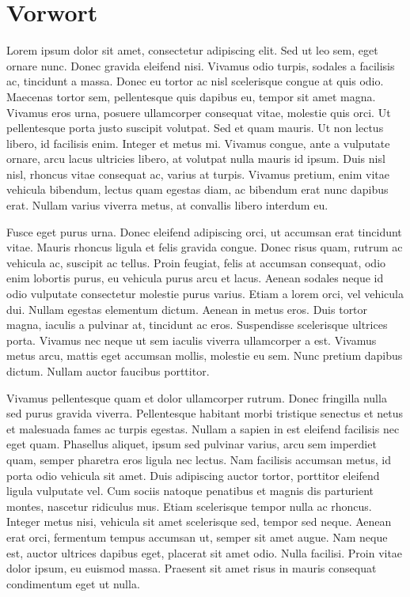 \chapter{Vorwort}
Lorem ipsum dolor sit amet, consectetur adipiscing elit. Sed ut leo sem, eget ornare nunc. Donec gravida eleifend nisi. Vivamus odio turpis, sodales a facilisis ac, tincidunt a massa. Donec eu tortor ac nisl scelerisque congue at quis odio. Maecenas tortor sem, pellentesque quis dapibus eu, tempor sit amet magna. Vivamus eros urna, posuere ullamcorper consequat vitae, molestie quis orci. Ut pellentesque porta justo suscipit volutpat. Sed et quam mauris. Ut non lectus libero, id facilisis enim. Integer et metus mi. Vivamus congue, ante a vulputate ornare, arcu lacus ultricies libero, at volutpat nulla mauris id ipsum. Duis nisl nisl, rhoncus vitae consequat ac, varius at turpis. Vivamus pretium, enim vitae vehicula bibendum, lectus quam egestas diam, ac bibendum erat nunc dapibus erat. Nullam varius viverra metus, at convallis libero interdum eu.

Fusce eget purus urna. Donec eleifend adipiscing orci, ut accumsan erat tincidunt vitae. Mauris rhoncus ligula et felis gravida congue. Donec risus quam, rutrum ac vehicula ac, suscipit ac tellus. Proin feugiat, felis at accumsan consequat, odio enim lobortis purus, eu vehicula purus arcu et lacus. Aenean sodales neque id odio vulputate consectetur molestie purus varius. Etiam a lorem orci, vel vehicula dui. Nullam egestas elementum dictum. Aenean in metus eros. Duis tortor magna, iaculis a pulvinar at, tincidunt ac eros. Suspendisse scelerisque ultrices porta. Vivamus nec neque ut sem iaculis viverra ullamcorper a est. Vivamus metus arcu, mattis eget accumsan mollis, molestie eu sem. Nunc pretium dapibus dictum. Nullam auctor faucibus porttitor.

Vivamus pellentesque quam et dolor ullamcorper rutrum. Donec fringilla nulla sed purus gravida viverra. Pellentesque habitant morbi tristique senectus et netus et malesuada fames ac turpis egestas. Nullam a sapien in est eleifend facilisis nec eget quam. Phasellus aliquet, ipsum sed pulvinar varius, arcu sem imperdiet quam, semper pharetra eros ligula nec lectus. Nam facilisis accumsan metus, id porta odio vehicula sit amet. Duis adipiscing auctor tortor, porttitor eleifend ligula vulputate vel. Cum sociis natoque penatibus et magnis dis parturient montes, nascetur ridiculus mus. Etiam scelerisque tempor nulla ac rhoncus. Integer metus nisi, vehicula sit amet scelerisque sed, tempor sed neque. Aenean erat orci, fermentum tempus accumsan ut, semper sit amet augue. Nam neque est, auctor ultrices dapibus eget, placerat sit amet odio. Nulla facilisi. Proin vitae dolor ipsum, eu euismod massa. Praesent sit amet risus in mauris consequat condimentum eget ut nulla.

